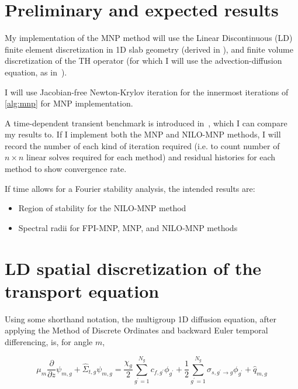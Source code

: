 \documentclass{proposal}
\newcommand{\ddz}{\frac{\partial}{\partial z}}
\newcommand{\p}{^\prime}
\begin{document}


\section{Preliminary and expected results}

My implementation of the MNP method will use the Linear Discontinuous (LD) finite element discretization in 1D slab geometry (derived in ), and finite volume discretization of the TH operator (for which I will use the advection-diffusion equation, as in~\cite{adamowicz2021nilo}).

I will use Jacobian-free Newton-Krylov iteration for the innermost iterations of \autoref{alg:mnp} for MNP implementation.

A time-dependent transient benchmark is introduced in~\cite{tamang2014multilevel}, which I can compare my results to. If I implement both the MNP and NILO-MNP methods, I will record the number of each kind of iteration required (i.e. to count number of $n\times n$ linear solves required for each method) and residual histories for each method to show convergence rate.

If time allows for a Fourier stability analysis, the intended results are:

\begin{itemize}
    \item Region of stability for the NILO-MNP method
    \item Spectral radii for FPI-MNP, MNP, and NILO-MNP methods
\end{itemize}





\clearpage
\appendix

\section{LD spatial discretization of the transport equation}\label{sec:discretization}

Using some shorthand notation, the multigroup 1D diffusion equation, after applying the Method of Discrete Ordinates and backward Euler temporal differencing, is, for angle $m$,

\begin{equation}
    \mu_m \ddz \psi_{m, g} + \hat{\Sigma}_{t, g}\psi_{m, g} = \frac{\chi_g}{2}\sum_{g\p = 1}^{N_g} c_{f, g\p} \phi_{g\p} + \frac{1}{2}\sum_{g\p =1}^{N_g} \sigma_{s, g\p \rightarrow g}\phi_{g\p} + \hat{q}_{m, g}\label{eq:shorthand}
\end{equation}
\end{document}
